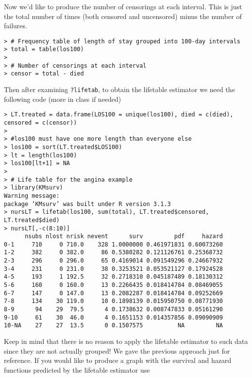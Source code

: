 \begin{enumerate}[(a)]
Now we'd like to produce the number of censorings at each interval. This is just the total number of times (both censored and uncensored) minus the number of failures.
\begin{spacing}{1.2}
\begin{footnotesize}
\begin{verbatim}
> # Frequency table of length of stay grouped into 100-day intervals
> total = table(los100)
> 
> # Number of censorings at each interval
> censor = total - died
\end{verbatim}
\end{footnotesize}
\end{spacing}
Then after examining \verb|?lifetab|, to obtain the lifetable estimator we need the following code (more in class if needed)
\begin{spacing}{1.2}
\begin{footnotesize}
\begin{verbatim}
> LT.treated = data.frame(LOS100 = unique(los100), died = c(died), censored = c(censor))
> 
> #los100 must have one more length than everyone else
> los100 = sort(LT.treated$LOS100)
> lt = length(los100)
> los100[lt+1] = NA
> 
> # Life table for the angina example
> library(KMsurv)
Warning message:
package ‘KMsurv’ was built under R version 3.1.3 
> nursLT = lifetab(los100, sum(total), LT.treated$censored, LT.treated$died)
> nursLT[,-c(8:10)]
      nsubs nlost nrisk nevent      surv         pdf     hazard
0-1     710     0 710.0    328 1.0000000 0.461971831 0.60073260
1-2     382     0 382.0     86 0.5380282 0.121126761 0.25368732
2-3     296     0 296.0     65 0.4169014 0.091549296 0.24667932
3-4     231     0 231.0     38 0.3253521 0.053521127 0.17924528
4-5     193     1 192.5     32 0.2718310 0.045187489 0.18130312
5-6     160     0 160.0     13 0.2266435 0.018414784 0.08469055
6-7     147     0 147.0     13 0.2082287 0.018414784 0.09252669
7-8     134    30 119.0     10 0.1898139 0.015950750 0.08771930
8-9      94    29  79.5      4 0.1738632 0.008747833 0.05161290
9-10     61    30  46.0      4 0.1651153 0.014357856 0.09090909
10-NA    27    27  13.5      0 0.1507575          NA         NA
\end{verbatim}
\end{footnotesize}
\end{spacing}
Keep in mind that there is no reason to apply the lifetable estimator to such data since they are not actually grouped! We gave the previous approach just for reference. If you would like to produce a graph with the survival and hazard functions predicted by the lifetable estimator use

\end{enumerate}
